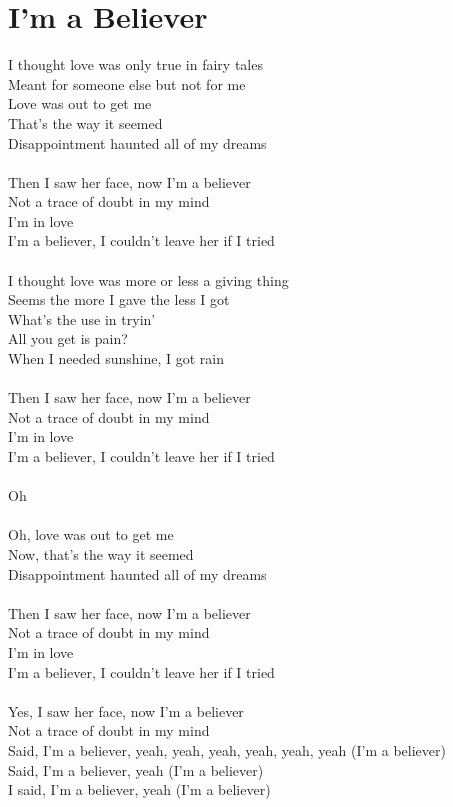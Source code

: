 \section{I'm a Believer}
I thought love was only true in fairy tales\\
Meant for someone else but not for me\\
Love was out to get me\\
That's the way it seemed\\
Disappointment haunted all of my dreams\\
\\
Then I saw her face, now I'm a believer\\
Not a trace of doubt in my mind\\
I'm in love\\
I'm a believer, I couldn't leave her if I tried\\
\\
I thought love was more or less a giving thing\\
Seems the more I gave the less I got\\
What's the use in tryin'\\
All you get is pain?\\
When I needed sunshine, I got rain\\
\\
Then I saw her face, now I'm a believer\\
Not a trace of doubt in my mind\\
I'm in love\\
I'm a believer, I couldn't leave her if I tried\\
\\
Oh\\
\\
Oh, love was out to get me\\
Now, that's the way it seemed\\
Disappointment haunted all of my dreams\\
\\
Then I saw her face, now I'm a believer\\
Not a trace of doubt in my mind\\
I'm in love\\
I'm a believer, I couldn't leave her if I tried\\
\\
Yes, I saw her face, now I'm a believer\\
Not a trace of doubt in my mind\\
Said, I'm a believer, yeah, yeah, yeah, yeah, yeah, yeah (I'm a believer)\\
Said, I'm a believer, yeah (I'm a believer)\\
I said, I'm a believer, yeah (I'm a believer)\\